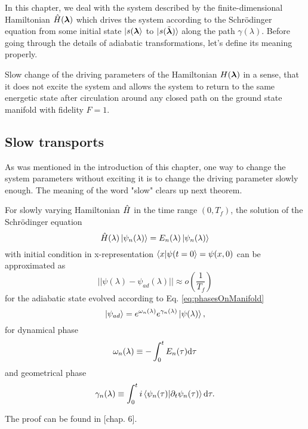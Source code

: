 In this chapter, we deal with the system described by the finite-dimensional Hamiltonian $\hat{H}({\bm\lambda})$ which drives the system according to the Schr\"odinger equation from some initial state $\ket{s({\bm\lambda}}$ to $\ket{s(\tilde{{\bm\lambda}})}$ along the path $\gamma(\lambda)$. Before going through the details of adiabatic transformations, let's define its meaning properly.

\begin{definition}[Adibaticity]
    Slow change of the driving parameters of the Hamiltonian $H({\bm\lambda})$ in a sense, that it does not excite the system and allows the system to return to the same energetic state after circulation around any closed path on the ground state manifold with fidelity $F=1$. 
\end{definition}


\subsection{Slow transports}
As was mentioned in the introduction of this chapter, one way to change the system parameters without exciting it is to change the driving parameter slowly enough. The meaning of the word "slow" clears up next theorem.
\begin{thm}
    \label{adiabaticTheorem}
    For slowly varying Hamiltonian $\hat{H}$ in the time range $(0,T_f)$, the solution of the Schrödinger equation 
    $$\hat{H}(\lambda)\ket{\psi_n(\lambda)} = E_n(\lambda)\ket{\psi_n(\lambda)}$$
    with initial condition in x-representation $\braket{x|\psi(t=0}=\psi(x,0)$ can be approximated as
    \begin{equation}
      ||\psi(\lambda) - \psi_{ad}(\lambda)||\approx o\left(\frac{1}{T_f}\right)
    \end{equation}
    for the adiabatic state evolved according to Eq. \ref{eq:phasesOnManifold}
    \begin{equation}
        \ket{\psi_{ad}}= e^{\omega_n(\lambda)}e^{\gamma_n(\lambda)}\ket{\psi(\lambda)},
    \end{equation}
    for dynamical phase
    $$\omega_n(\lambda)\equiv -\int_0^t E_n(\tau)\mathrm{d} \tau$$
    and geometrical phase
        $$\gamma_n(\lambda)\equiv \int_0^t i\braket{\psi_n(\tau)|\partial_t\psi_n(\tau)} \mathrm{d} \tau .$$
\end{thm}
\begin{myproof}
    The proof can be found in \cite{sakurai}[chap. 6].
\end{myproof}














